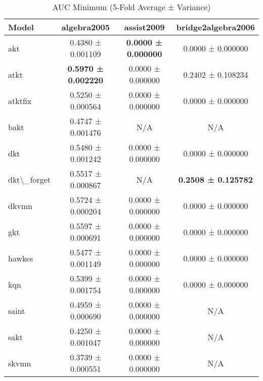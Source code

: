 \begin{table}[H]
\centering
\caption{AUC Minimum (5-Fold Average ± Variance)}
\label{tab:auc_min}
\begin{tabular}{lccc}
\toprule
Model & algebra2005 & assist2009 & bridge2algebra2006 \\
\midrule
akt & 0.4380 ± 0.001109 & \textbf{0.0000 ± 0.000000} & 0.0000 ± 0.000000 \\
atkt & \textbf{0.5970 ± 0.002220} & 0.0000 ± 0.000000 & 0.2402 ± 0.108234 \\
atktfix & 0.5250 ± 0.000564 & 0.0000 ± 0.000000 & 0.0000 ± 0.000000 \\
bakt & 0.4747 ± 0.001476 & N/A & N/A \\
dkt & 0.5480 ± 0.001242 & 0.0000 ± 0.000000 & 0.0000 ± 0.000000 \\
dkt\textbackslash{}_forget & 0.5517 ± 0.000867 & N/A & \textbf{0.2508 ± 0.125782} \\
dkvmn & 0.5724 ± 0.000204 & 0.0000 ± 0.000000 & 0.0000 ± 0.000000 \\
gkt & 0.5597 ± 0.000691 & 0.0000 ± 0.000000 & 0.0000 ± 0.000000 \\
hawkes & 0.5477 ± 0.001149 & 0.0000 ± 0.000000 & 0.0000 ± 0.000000 \\
kqn & 0.5399 ± 0.001754 & 0.0000 ± 0.000000 & 0.0000 ± 0.000000 \\
saint & 0.4959 ± 0.000690 & 0.0000 ± 0.000000 & N/A \\
sakt & 0.4250 ± 0.001047 & 0.0000 ± 0.000000 & N/A \\
skvmn & 0.3739 ± 0.000551 & 0.0000 ± 0.000000 & N/A \\
\bottomrule
\end{tabular}
\end{table}